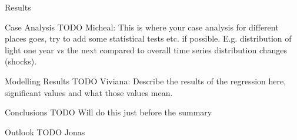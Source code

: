 \documentclass[12pt,fleqn,leqno,letterpaper]{article}
\begin{document}
\begin{section}{Results}
  \begin{subsection}{Case Analysis}
    TODO Micheal: This is where your case analysis for different places goes, try to add some statistical tests etc. if possible. E.g. distribution of light one year vs the next compared to overall time series distribution changes (shocks).
  \end{subsection}
  \begin{subsection}{Modelling Results}
    TODO Viviana: Describe the results of the regression here, significant values and what those values mean.
  \end{subsection}
  \begin{subsection}{Conclusions}
    TODO Will do this just before the summary
  \end{subsection}
  \begin{subsection}{Outlook}
    TODO Jonas
  \end{subsection}
\end{section}


\end{document}
